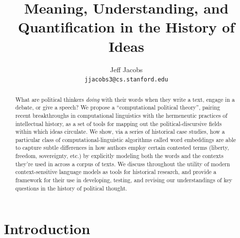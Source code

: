 \documentclass[11pt]{article}
\title{Meaning, Understanding, and Quantification in the History of Ideas}
\author{Jeff Jacobs\\\texttt{jjacobs3@cs.stanford.edu}}
\begin{document}
	
	\maketitle
	
\begin{abstract}
\noindent What are political thinkers \textit{doing} with their words when they write a text, engage in a debate, or give a speech? We propose a ``computational political theory'', pairing recent breakthroughs in computational linguistics with the hermeneutic practices of intellectual history, as a set of tools for mapping out the political-discursive fields within which ideas circulate. We show, via a series of historical case studies, how a particular class of computational-linguistic algorithms called word embeddings are able to capture subtle differences in how authors employ certain contested terms (liberty, freedom, sovereignty, etc.) by explicitly modeling both the words and the contexts they're used in across a corpus of texts. We discuss throughout the utility of modern context-sensitive language models as tools for historical research, and provide a framework for their use in developing, testing, and revising our understandings of key questions in the history of political thought.
\end{abstract}

\doublespacing

%
%
%	
	

\tableofcontents

\section{Introduction}\label{sec:intro}
\end{document}
